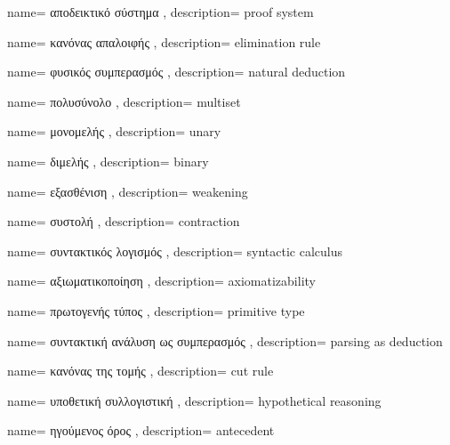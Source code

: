 {name={
αποδεικτικό σύστημα
},
description={
proof system
}}

{name={
κανόνας απαλοιφής
},
description={
elimination rule
}}

{name={
φυσικός συμπερασμός
},
description={
natural deduction
}}

{name={
πολυσύνολο
},
description={
multiset
}}

{name={
μονομελής
},
description={
unary
}}

{name={
διμελής
},
description={
binary
}}

{name={
εξασθένιση
},
description={
weakening
}}

{name={
συστολή
},
description={
contraction
}}

{name={
συντακτικός λογισμός
},
description={
syntactic calculus
}}

{name={
αξιωματικοποίηση
},
description={
axiomatizability
}}

{name={
πρωτογενής τύπος
},
description={
primitive type
}}

{name={
συντακτική ανάλυση ως συμπερασμός
},
description={
parsing as deduction
}}

{name={
κανόνας της τομής
},
description={
cut rule
}}

{name={
υποθετική συλλογιστική
},
description={
hypothetical reasoning
}}

{name={
ηγούμενος όρος
},
description={
antecedent
}}

